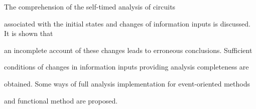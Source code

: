  \noindent


 The comprehension of the self-timed analysis of circuits


associated with the initial states and changes of information inputs is discussed. It is shown that


an incomplete account of these changes leads to erroneous conclusions. Sufficient


conditions of changes in information inputs providing analysis completeness are


obtained. Some ways of full analysis implementation for event-oriented methods


and functional method are proposed.















\pagebreak






















 \def\tit{THE IMPACT OF~TRANSIENT FAILURES ON~MICROPROCESSOR SYSTEMS CACHE RELIABILITY}







 \def\aut{V.~Zakharov and B.~Shmeilin}


















